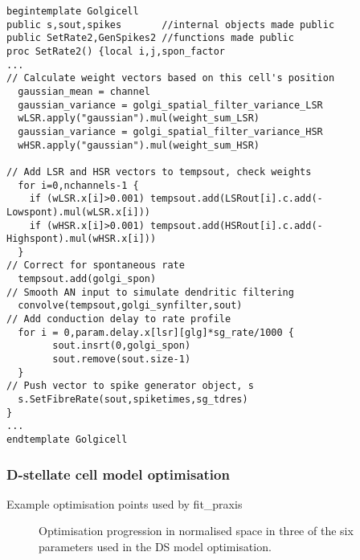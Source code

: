 \begin{lstlisting}[label=lst:GolgiTemplate,caption=Rate-based golgi cell model
  template (in par\_CNcell.tem)]
begintemplate Golgicell
public s,sout,spikes       //internal objects made public   
public SetRate2,GenSpikes2 //functions made public
proc SetRate2() {local i,j,spon_factor
...
// Calculate weight vectors based on this cell's position 
  gaussian_mean = channel
  gaussian_variance = golgi_spatial_filter_variance_LSR
  wLSR.apply("gaussian").mul(weight_sum_LSR)
  gaussian_variance = golgi_spatial_filter_variance_HSR
  wHSR.apply("gaussian").mul(weight_sum_HSR)

// Add LSR and HSR vectors to tempsout, check weights 
  for i=0,nchannels-1 {
    if (wLSR.x[i]>0.001) tempsout.add(LSRout[i].c.add(-Lowspont).mul(wLSR.x[i]))
    if (wHSR.x[i]>0.001) tempsout.add(HSRout[i].c.add(-Highspont).mul(wHSR.x[i]))
  }
// Correct for spontaneous rate 
  tempsout.add(golgi_spon)
// Smooth AN input to simulate dendritic filtering 
  convolve(tempsout,golgi_synfilter,sout)
// Add conduction delay to rate profile 
  for i = 0,param.delay.x[lsr][glg]*sg_rate/1000 {
        sout.insrt(0,golgi_spon)
        sout.remove(sout.size-1)
  }
// Push vector to spike generator object, s 
  s.SetFibreRate(sout,spiketimes,sg_tdres)
}
...
endtemplate Golgicell

\end{lstlisting}



\subsubsection[D-stellate cell model]{D-stellate cell model optimisation}

Example optimisation points used by \textsf{fit\_praxis} 
\begin{figure}[htb]
\centering
{}
 \caption{Optimisation progression in normalised space in three of the six parameters used in the DS model optimisation.} \label{fig:praxis}
 \end{figure}


